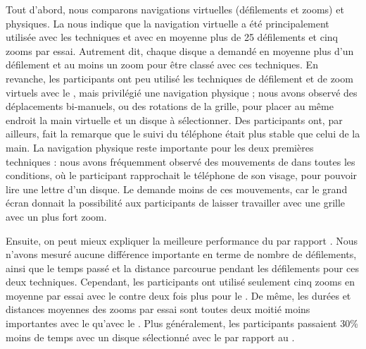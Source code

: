 Tout d'abord, nous comparons navigations virtuelles (défilements et zooms) et physiques. La  nous indique que la navigation virtuelle a été principalement utilisée avec les techniques  et  avec en moyenne plus de 25 défilements et cinq zooms par essai. Autrement dit, chaque disque a demandé en moyenne plus d'un défilement et au moins un zoom pour être classé avec ces techniques. En revanche, les participants ont peu utilisé les techniques de défilement et de zoom virtuels avec le , mais privilégié une navigation physique  ; nous avons observé des déplacements bi-manuels, ou des rotations de la grille, pour placer au même endroit la main virtuelle et un disque à sélectionner. Des participants ont, par ailleurs, fait la remarque que le suivi du téléphone était plus stable que celui de la main. La navigation physique reste importante pour les deux premières techniques  : nous avons fréquemment observé des mouvements de  dans toutes les conditions, où le participant rapprochait le téléphone de son visage, pour pouvoir lire une lettre d'un disque. Le  demande moins de ces mouvements, car le grand écran donnait la possibilité aux participants de laisser travailler avec une grille avec un plus fort zoom.

Ensuite, on peut mieux expliquer la meilleure performance du  par rapport . Nous n'avons mesuré aucune différence importante en terme de nombre de défilements, ainsi que le temps passé  et la distance parcourue pendant les défilements pour ces deux techniques. Cependant, les participants ont utilisé seulement cinq zooms en moyenne par essai avec le  contre deux fois plus pour le . De même, les durées et distances moyennes des zooms par essai  sont toutes deux moitié moins importantes avec le  qu'avec le . Plus généralement, les participants passaient 30\% moins de temps avec un disque sélectionné avec le  par rapport au  .


